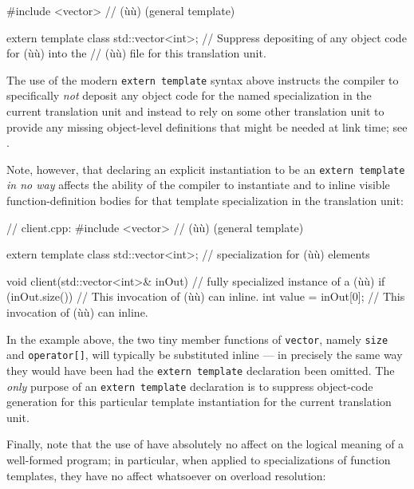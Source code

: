 \begin{emcppslisting}
#include <vector>  // (ù{}ù) (general template)

extern template class std::vector<int>;
    // Suppress depositing of any object code for (ù{}ù) into the
    // (ù{}ù) file for this translation unit.
\end{emcppslisting}

\noindent The use of the modern \lstinline!extern!~\lstinline!template! syntax above
instructs the compiler to specifically \emph{not} deposit any object
code for the named specialization in the current translation unit and
instead to rely on some other translation unit to provide any missing
object-level definitions that might be needed at link time; see
.

Note, however, that declaring an explicit instantiation to be an
\lstinline!extern!~\lstinline!template! \emph{in no way} affects the ability
of the compiler to instantiate and to inline visible function-definition
bodies for that template specialization in the translation unit:

\begin{emcppslisting}
// client.cpp:
#include <vector>  // (ù{}ù) (general template)

extern template class std::vector<int>;  // specialization for (ù{}ù) elements

void client(std::vector<int>& inOut)  // fully specialized instance of a (ù{}ù)
{
    if (inOut.size())          // This invocation of (ù{}ù) can inline.
    {
        int value = inOut[0];  // This invocation of (ù{}ù) can inline.
    }
}
\end{emcppslisting}

\noindent In the example above, the two tiny member functions of \lstinline!vector!,
namely \lstinline!size! and \lstinline!operator[]!, will typically be
substituted inline --- in precisely the same way they would have been
had the \lstinline!extern!~\lstinline!template! declaration been omitted. The
\emph{only} purpose of an \lstinline!extern!~\lstinline!template! declaration
is to suppress object-code generation for this particular template
instantiation for the current translation unit.

Finally, note that the use of  have absolutely no affect on the logical meaning of a
well-formed program; in particular, when applied to specializations of
function templates, they have no affect whatsoever on overload
resolution:

